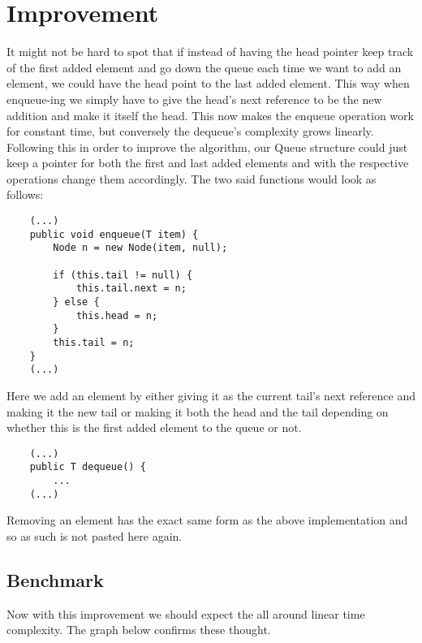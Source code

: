 \documentclass[a4paper,11pt]{article}
\begin{document}
\section*{Improvement}

It might not be hard to spot that if instead of having the head pointer keep track of the first added element and go down the queue each time we want to add an element, we could have the head point to the last added element. This way when enqueue-ing we simply have to give the head's next reference to be the new addition and make it itself the head. This now makes the enqueue operation work for constant time, but conversely the dequeue's complexity grows linearly. 
\\

Following this in order to improve the algorithm, our Queue structure could just keep a pointer for both the first and last added elements and with the respective operations change them accordingly. The two said functions would look as follows:

\begin{verbatim}
    (...)
    public void enqueue(T item) {
        Node n = new Node(item, null);

        if (this.tail != null) {
            this.tail.next = n;
        } else {
            this.head = n;
        }
        this.tail = n;
    }
    (...)
\end{verbatim}

Here we add an element by either giving it as the current tail's next reference and making it the new tail or making it both the head and the tail depending on whether this is the first added element to the queue or not. 

\begin{verbatim}
    (...)
    public T dequeue() {
        ...
    (...)
\end{verbatim}

Removing an element has the exact same form as the above implementation and so as such is not pasted here again.

\subsection*{Benchmark}

Now with this improvement we should expect the all around linear time complexity. The graph below confirms these thought.  
\end{document}
